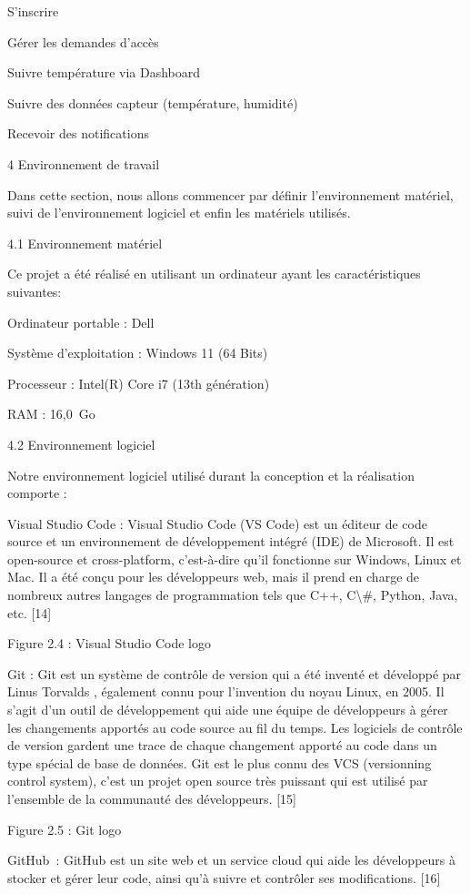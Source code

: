 \documentclass{article}
\begin{document}
S'inscrire

Gérer les demandes d’accès

Suivre température via Dashboard

Suivre des données capteur (température, humidité) 

Recevoir des notifications

4 Environnement de travail

Dans cette section, nous allons commencer par définir l’environnement matériel, suivi de l’environnement logiciel et enfin les matériels utilisés.

4.1 Environnement matériel

Ce projet a été réalisé en utilisant un ordinateur ayant les caractéristiques suivantes:

Ordinateur portable : Dell

Système d’exploitation : Windows 11 (64 Bits)

Processeur : Intel(R) Core i7 (13th génération)

RAM : 16,0 Go

4.2 Environnement logiciel

Notre environnement logiciel utilisé durant la conception et la réalisation comporte :

Visual Studio Code : Visual Studio Code (VS Code) est un éditeur de code source et un environnement de développement intégré (IDE) de Microsoft. Il est open-source et cross-platform, c’est-à-dire qu’il fonctionne sur Windows, Linux et Mac. Il a été conçu pour les développeurs web, mais il prend en charge de nombreux autres langages de programmation tels que C++, C\textbackslash{}#, Python, Java, etc. [14]

Figure 2.4 : Visual Studio Code logo

Git : Git est un système de contrôle de version qui a été inventé et développé par Linus Torvalds , également connu pour l’invention du noyau Linux, en 2005. Il s’agit d’un outil de développement qui aide une équipe de développeurs à gérer les changements apportés au code source au fil du temps. Les logiciels de contrôle de version gardent une trace de chaque changement apporté au code dans un type spécial de base de données. Git est le plus connu des VCS (versionning control system), c’est un projet open source très puissant qui est utilisé par l’ensemble de la communauté des développeurs. [15]

Figure 2.5 : Git logo

GitHub : GitHub est un site web et un service cloud qui aide les développeurs à stocker et gérer leur code, ainsi qu'à suivre et contrôler ses modifications. [16]
\end{document}
